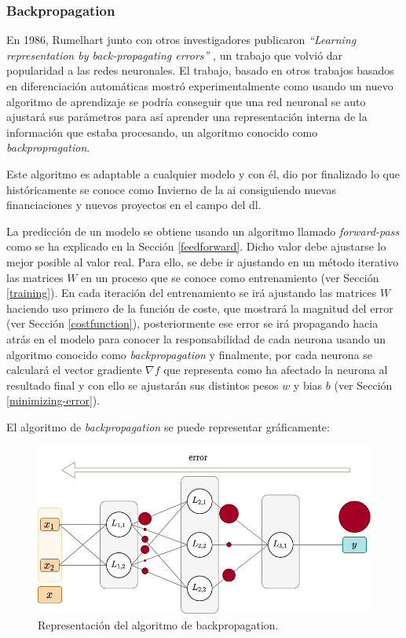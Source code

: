 \subsubsection{Backpropagation}\label{backpropagation}

En 1986, Rumelhart junto con otros investigadores publicaron \textit{“Learning representation by back-propagating errors”} \cite{rumelhart}, un trabajo que volvió dar popularidad a las redes neuronales. El trabajo, basado en otros trabajos basados en diferenciación automáticas mostró experimentalmente como usando un nuevo algoritmo de aprendizaje se podría conseguir que una red neuronal se auto ajustará sus parámetros para así aprender una representación interna de la información que estaba procesando, un algoritmo conocido como \textit{backpropragation}.
\newline

Este algoritmo es adaptable a cualquier modelo y con él, dio por finalizado lo que históricamente se conoce como Invierno de la \acrshort{ai} consiguiendo nuevas financiaciones y nuevos proyectos en el campo del \acrfull{dl}.
\newline

La predicción de un modelo se obtiene usando un algoritmo llamado \textit{forward-pass} como se ha explicado en la Sección \ref{feedforward}. Dicho valor debe ajustarse lo mejor posible al valor real. Para ello, se debe ir ajustando en un método iterativo las matrices $W$ en un proceso que se conoce como entrenamiento (ver Sección \ref{training}). En cada iteración del entrenamiento se irá ajustando las matrices $W$ haciendo uso primero de la función de coste, que mostrará la magnitud del error (ver Sección \ref{costfunction}), posteriormente ese error se irá propagando hacia atrás en el modelo para conocer la responsabilidad de cada neurona usando un algoritmo conocido como \textit{backpropagation} y finalmente, por cada neurona se calculará el vector gradiente $\nabla f$ que representa como ha afectado la neurona al resultado final y con ello se ajustarán sus distintos pesos $w$ y bias $b$ (ver Sección \ref{minimizing-error}). 
\newline

El algoritmo de \textit{backpropagation} se puede representar gráficamente:

\begin{figure}[H]
    \centering
    \includegraphics[width=14cm]{images/state-of-art/back-propagation/network_descent_gradient.png}
    \caption{Representación del algoritmo de backpropagation.}
    \label{fig:basic_network}
\end{figure}

